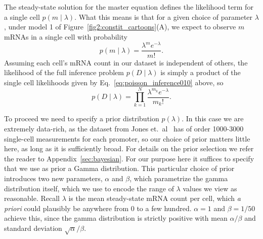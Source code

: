 The steady-state solution for the master equation defines the likelihood term
for a single cell $p(m \mid \lambda)$. What this means is that for a given
choice of parameter $\lambda$, under model 1 of
Figure~\ref{fig2:constit_cartoons}(A), we expect to observe $m$ mRNAs in a
single cell with probability
\begin{equation}
p(m\mid\lambda) = \frac{\lambda^m e^{-\lambda}}{m!}.
\label{eq:poisson_inference010}
\end{equation}
Assuming each cell's mRNA count in our dataset is independent of others, the
likelihood of the full inference problem $p(D\mid\lambda)$ is simply a product
of the single cell likelihoods given by Eq.~\ref{eq:poisson_inference010} above, so
\begin{equation}
p(D\mid\lambda) = \prod_{k=1}^N \frac{\lambda^{m_k}e^{-\lambda}}{m_k!}.
\end{equation}

To proceed we need to specify a prior distribution $p(\lambda)$. In this case we
are extremely data-rich, as the dataset from Jones et.\ al~\cite{Jones2014} has
of order 1000-3000 single-cell measurements for each promoter, so our choice of
prior matters little here, as long as it is sufficiently broad. For details on
the prior selection we refer the reader to Appendix~\ref{sec:bayesian}. For our
purpose here it suffices to specify that we use as prior a Gamma distribution.
This particular choice of prior introduces two new parameters, $\alpha$ and
$\beta$, which parametrize the gamma distribution itself, which we use to encode
the range of $\lambda$ values we view as reasonable. Recall $\lambda$ is the
mean steady-state mRNA count per cell, which \textit{a priori} could plausibly
be anywhere from 0 to a few hundred. $\alpha=1$ and $\beta=1/50$ achieve this,
since the gamma distribution is strictly positive with mean $\alpha/\beta$ and
standard deviation $\sqrt{\alpha}/\beta$.

